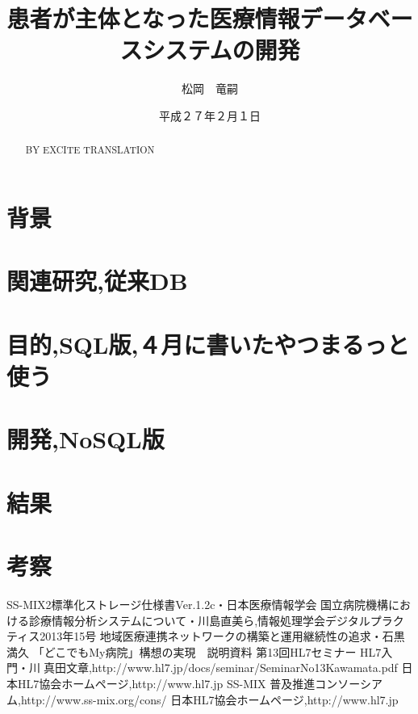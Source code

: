 \documentclass[12pt]{sotsuron}
\title{患者が主体となった医療情報データベースシステムの開発}
\author{松岡　竜嗣}
\date{平成２７年２月１日}
\affiliation{電子機械工学専攻}
\begin{document}
\maketitle
\begin{abstract}

BY EXCITE TRANSLATION
\end{abstract}

\tableofcontents
\clearpage

\section{背景}


\section{関連研究,従来DB}


\section{目的,SQL版,４月に書いたやつまるっと使う}


\section{開発,NoSQL版}


\section{結果}


\section{考察}



\appendix

%


\begin{thebibliography}{9}
  SS-MIX2標準化ストレージ仕様書Ver.1.2c・日本医療情報学会
   国立病院機構における診療情報分析システムについて・川島直美ら,情報処理学会デジタルプラクティス2013年15号
   地域医療連携ネットワークの構築と運用継続性の追求・石黒満久
   「どこでもMy病院」構想の実現　説明資料
   第13回HL7セミナー HL7入門・川真田文章,http://www.hl7.jp/docs/seminar/SeminarNo13Kawamata.pdf
   日本HL7協会ホームページ,http://www.hl7.jp
   SS-MIX 普及推進コンソーシアム,http://www.ss-mix.org/cons/
   日本HL7協会ホームページ,http://www.hl7.jp

\end{thebibliography}


\clearpage

\listoffigures
\clearpage

\listoftables
\clearpage
\end{document}
